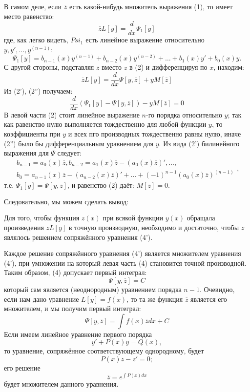 В самом деле, если $\overline{z}$ есть какой-нибудь множитель выражения (1), то имеет место равенство:
\[
	\overline{z} L[y] = \frac{d}{dx} \Psi_1 [y] \tag{2'}
\]
где, как легко видеть, $Psi_1$ есть линейное выражение относительно $y, y', \dots, y^{(n-1)}$:
\[
	\Psi_1[y] = b_{n-1}(x) y^{(n-1)} + b_{n-2} (x) y^{(n-2)} + \dots + b_1 (x) y' + b_0 (x) y.
\]
С другой стороны, подставляя $\overline{z}$ вместо $z$ в (2) и дифференцируя по $x$, находим:
\[
	\overline{z} L[y] = \frac{d}{dx} \Psi\left[ y, \overline{z}\right] + y M\left[ \overline{z}\right] \tag{2''}
\]
Из (2'), (2'') получаем:
\[
	\frac{d}{dx} \left( \Psi_1[y] - \Psi\left[ y, \overline{z}\right]\right) - yM\left[ \overline{z}\right]= 0 \tag{2\textquotesingle \textquotesingle \textquotesingle}
\]
В левой части (2\textquotesingle \textquotesingle \textquotesingle) стоит линейное выражение $n$-го порядка относительно $y$; так как равенство нулю выполняется тождественно для любой функции $y$, то коэффициенты при $y$ и всех пго производных тождественно равны нулю, иначе (2'') было бы дифференциальным уравнением для $y$. Из вида (2') билинейного выражения для $\Psi$ следует:
\[
	\begin{aligned}
		b_{n-1} = a_0 (x) \overline{z}, b_{n-2} = a_1 (x) \overline{z} - \left(a_0(x) \overline{z} \right)', \dots, \\
		b_0 = a_{n-1} (x) \overline{z} - \left(a_{n-2} (x) \overline{z}\right)' + \dots + (-1)^{n-1} \left( a_0(x) \overline{z}\right)^{(n-1)}
	\end{aligned},
\]
т.е. $\Psi_1[y] = \Psi \left[ y, \overline{z}\right]$, и равенство (2\textquotesingle \textquotesingle \textquotesingle) даёт: $M\left[ \overline{z}\right]=0$.

Следовательно, мы можем сделать вывод:

Для того, чтобы функция $z(x)$ при всякой функции $y(x)$ обращала произведения $\overline{z}L[y]$ в точную производную, необходимо и достаточно, чтобы $\overline{z}$ являлось решением сопряжённого уравнения (4').

Каждое решение сопряжённого уравнения (4') является множителем уравнения (4'), при умножении на который левая часть (4) становится точной производной. Таким образом, (4) допускает первый интеграл:
\[
	\Psi\left[ y, \overline{z}\right] = C \tag{5}
\]
который сам является (неоднородным) уравнением порядка $n-1$. Очевидно, если нам дано уравнение $L[y]=f(x)$, то та же функция $\overline{z}$ является его множителем, и мы получим первый интеграл:
\[
	\Psi \left[ y, \overline{z}\right] = \int f(x) \overline{z}dx + C
\]
Если имеем линейное уравнение первого порядка
\[
	y'+P(x)y = Q(x),
\]
то уравнение, сопряжённое соответствующему однородному, будет
\[
	P(x)z-z'=0;
\]
его решение
\[
	\overline{z} = e^{\int P(x)dx}	
\]
будет множителем данного уравнения.

